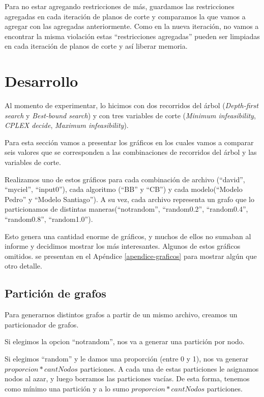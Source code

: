 \documentclass[a4paper, 10pt, twoside]{article}
\begin{document}
Para no estar agregando restricciones de más, guardamos las restricciones agregadas en cada iteración de planos de corte y comparamos la que vamos a agregar con las agregadas anteriormente. Como en la nueva iteración, no vamos a encontrar la misma violación estas ``restricciones agregadas'' pueden ser limpiadas en cada iteración de planos de corte y así liberar memoria.

\section{Desarrollo}

Al momento de experimentar, lo hicimos con dos recorridos del árbol (\emph{Depth-first search} y \emph{Best-bound search}) y con tres variables de corte (\emph{Minimum infeasibility}, \emph{CPLEX decide}, \emph{Maximum infeasibility}).

Para esta sección vamos a presentar los gráficos en los cuales vamos a comparar seis valores que se corresponden a las combinaciones de recorridos del árbol y las variables de corte.

Realizamos uno de estos gráficos para cada combinación de archivo (``david'', ``myciel'',  ``input0''), cada algoritmo (``BB'' y ``CB'') y cada modelo(``Modelo Pedro'' y ``Modelo Santiago''). A su vez, cada archivo representa un grafo que lo particionamos de distintas maneras(``notrandom'', ``random0.2'', ``random0.4'', ``random0.8'', ``random1.0'').

Esto genera una cantidad enorme de gráficos, y muchos de ellos no sumaban al informe y decidimos mostrar los más interesantes. Algunos de estos gráficos omitidos. se presentan en el Apéndice \ref{apendice-graficos} para mostrar algún que otro detalle.


\subsection{Partición de grafos}

Para generarnos distintos grafos a partir de un mismo archivo, creamos un particionador de grafos.

Si elegimos la opcion ``notrandom'', nos va a generar una partición por nodo.

Si elegimos ``random'' y le damos una proporción (entre 0 y 1), nos va generar $proporcion * cantNodos$ particiones. A cada una de estas particiones le asignamos nodos al azar, y luego borramos las particiones vacías. De esta forma, tenemos como mínimo una partición y a lo sumo $proporcion * cantNodos$ particiones.
\end{document}
